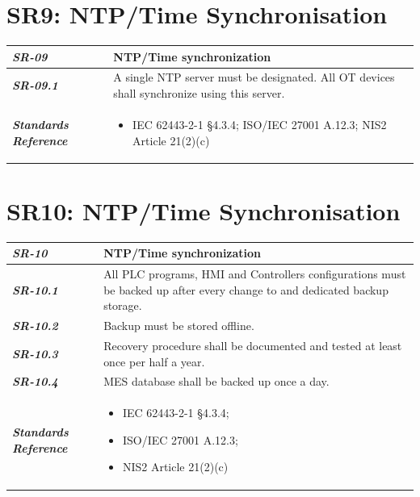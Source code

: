 \documentclass{report}
\begin{document}
\section{SR9: NTP/Time Synchronisation}\label{SR9:ntp}

\begin{tabularx}{\textwidth}{>{\bfseries}p{2.5cm} X}
    \textit{SR-09} & \textbf{NTP/Time synchronization} \vspace{0.5em}\\
\toprule
\textit{SR-09.1} &
    A single NTP server must be designated. All OT devices shall synchronize using this server.
    \vspace{0.5em}
\\
\midrule
    \textit{Standards Reference} &
\begin{itemize}[label=-, noitemsep, topsep=0pt, leftmargin=*]
    \item IEC 62443-2-1 §4.3.4; ISO/IEC 27001 A.12.3; NIS2 Article 21(2)(c)
\end{itemize} \vspace{1em} \\ 
\end{tabularx}
\vspace{2em}

\section{SR10: NTP/Time Synchronisation}\label{SR10:ntp2}

\begin{tabularx}{\textwidth}{>{\bfseries}p{2.5cm} X}
    \textit{SR-10} & \textbf{NTP/Time synchronization} \vspace{0.5em}\\
\toprule
\textit{SR-10.1} &
    All PLC programs, HMI and Controllers configurations must be backed up after every change to and dedicated backup storage. 
    \vspace{0.5em}
\\
\textit{SR-10.2} &
    Backup must be stored offline.
    \vspace{0.5em}
\\
\textit{SR-10.3} &
    Recovery procedure shall be documented and tested at least once per half a year.
    \vspace{0.5em}
\\
\textit{SR-10.4} &
    MES database shall be backed up once a day.
    \vspace{0.5em}
\\
\midrule
    \textit{Standards Reference} &
\begin{itemize}[label=-, noitemsep, topsep=0pt, leftmargin=*]
    \item IEC 62443-2-1 §4.3.4; 
    \item ISO/IEC 27001 A.12.3; 
    \item NIS2 Article 21(2)(c)
\end{itemize} \\ 
\end{tabularx}
\end{document}
